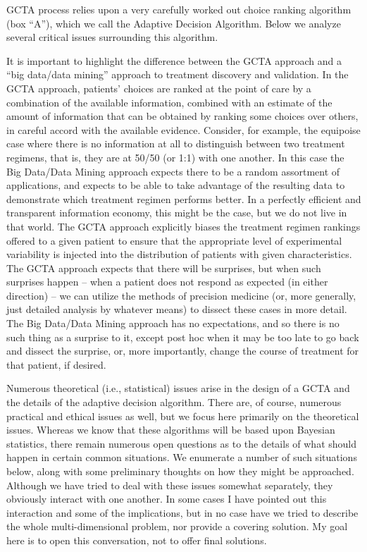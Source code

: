 \documentclass[12pt]{article}
\begin{document}
GCTA process relies upon a very carefully worked out choice ranking
algorithm (box “A”), which we call the Adaptive Decision
Algorithm. Below we analyze several critical issues surrounding this
algorithm.

It is important to highlight the difference between the GCTA approach
and a “big data/data mining” approach to treatment discovery
and validation. In the GCTA approach, patients’ choices are ranked at
the point of care by a combination of the available information,
combined with an estimate of the amount of information that can be
obtained by ranking some choices over others, in careful accord with
the available evidence. Consider, for example, the equipoise case
where there is no information at all to distinguish between two treatment regimens,
that is, they are at 50/50 (or 1:1) with one another. In this case the
Big Data/Data Mining approach expects there to be a random assortment of applications,
and expects to be able to take advantage of the resulting data to
demonstrate which treatment regimen performs better. In a perfectly efficient and
transparent information economy, this might be the case, but we do not
live in that world. The GCTA approach explicitly biases the treatment regimen
rankings offered to a given patient to ensure that the appropriate
level of experimental variability is injected into the distribution of
patients with given characteristics. The GCTA approach expects that
there will be surprises, but when such surprises happen – when a
patient does not respond as expected (in either direction) – we can
utilize the methods of precision medicine (or, more generally, just
detailed analysis by whatever means) to dissect these cases in more
detail. The Big Data/Data Mining approach has no expectations, and so there is no such
thing as a surprise to it, except post hoc when it may be too late to
go back and dissect the surprise, or, more importantly, change the
course of treatment for that patient, if desired.

Numerous theoretical (i.e., statistical) issues arise in the design of
a GCTA and the details of the adaptive decision algorithm. There are,
of course, numerous practical and ethical issues as well, but we focus
here primarily on the theoretical issues. Whereas we know that these
algorithms will be based upon Bayesian statistics, there remain
numerous open questions as to the details of what should happen in
certain common situations. We enumerate a number of such situations
below, along with some preliminary thoughts on how they might be
approached. Although we have tried to deal with these issues somewhat
separately, they obviously interact with one another. In some cases I
have pointed out this interaction and some of the implications, but in
no case have we tried to describe the whole multi-dimensional problem,
nor provide a covering solution. My goal here is to open this
conversation, not to offer final solutions.
\end{document}
